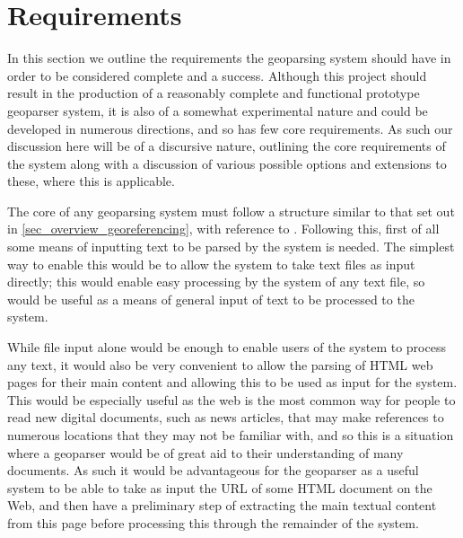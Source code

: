 \documentclass[12pt, a4paper]{report}
\begin{document}
\section{Requirements}
\label{sec:requirements}


In this section we outline the requirements the geoparsing system should have in order to be considered complete and a success. Although this project should result in the production of a reasonably complete and functional prototype geoparser system, it is also of a somewhat experimental nature and could be developed in numerous directions, and so has few core requirements. As such our discussion here will be of a discursive nature, outlining the core requirements of the system along with a discussion of various possible options and extensions to these, where this is applicable. 



The core of any geoparsing system must follow a structure similar to that set out in \ref{sec_overview_georeferencing}, with reference to \citet{hill2006}. Following this, first of all some means of inputting text to be parsed by the system is needed. The simplest way to enable this would be to allow the system to take text files as input directly; this would enable easy processing by the system of any text file, so would be useful as a means of general input of text to be processed to the system.

While file input alone would be enough to enable users of the system to process any text, it would also be very convenient to allow the parsing of HTML web pages for their main content and allowing this to be used as input for the system. This would be especially useful as the web is the most common way for people to read new digital documents, such as news articles, that may make references to numerous locations that they may not be familiar with, and so this is a situation where a geoparser would be of great aid to their understanding of many documents. As such it would be advantageous for the geoparser as a useful system to be able to take as input the URL of some HTML document on the Web, and then have a preliminary step of extracting the main textual content from this page before processing this through the remainder of the system.
\end{document}
